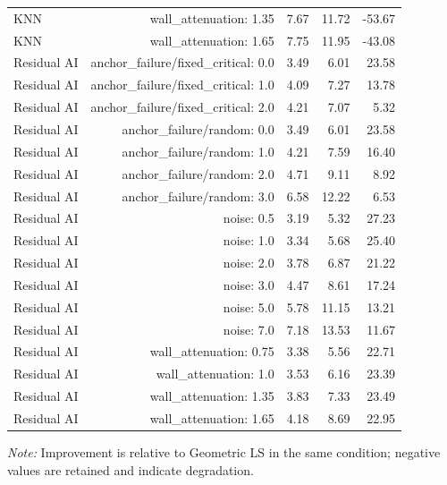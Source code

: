 \begin{table}[t]
\begin{tabular}{lrrrr}
KNN & wall\_attenuation: 1.35 & 7.67 & 11.72 & -53.67 \\
KNN & wall\_attenuation: 1.65 & 7.75 & 11.95 & -43.08 \\
Residual AI & anchor\_failure/fixed\_critical: 0.0 & 3.49 & 6.01 & 23.58 \\
Residual AI & anchor\_failure/fixed\_critical: 1.0 & 4.09 & 7.27 & 13.78 \\
Residual AI & anchor\_failure/fixed\_critical: 2.0 & 4.21 & 7.07 & 5.32 \\
Residual AI & anchor\_failure/random: 0.0 & 3.49 & 6.01 & 23.58 \\
Residual AI & anchor\_failure/random: 1.0 & 4.21 & 7.59 & 16.40 \\
Residual AI & anchor\_failure/random: 2.0 & 4.71 & 9.11 & 8.92 \\
Residual AI & anchor\_failure/random: 3.0 & 6.58 & 12.22 & 6.53 \\
Residual AI & noise: 0.5 & 3.19 & 5.32 & 27.23 \\
Residual AI & noise: 1.0 & 3.34 & 5.68 & 25.40 \\
Residual AI & noise: 2.0 & 3.78 & 6.87 & 21.22 \\
Residual AI & noise: 3.0 & 4.47 & 8.61 & 17.24 \\
Residual AI & noise: 5.0 & 5.78 & 11.15 & 13.21 \\
Residual AI & noise: 7.0 & 7.18 & 13.53 & 11.67 \\
Residual AI & wall\_attenuation: 0.75 & 3.38 & 5.56 & 22.71 \\
Residual AI & wall\_attenuation: 1.0 & 3.53 & 6.16 & 23.39 \\
Residual AI & wall\_attenuation: 1.35 & 3.83 & 7.33 & 23.49 \\
Residual AI & wall\_attenuation: 1.65 & 4.18 & 8.69 & 22.95 \\
\bottomrule
\end{tabular}
\par\smallskip\footnotesize\textit{Note:} Improvement is relative to Geometric LS in the same condition; negative values are retained and indicate degradation.
\end{table}
